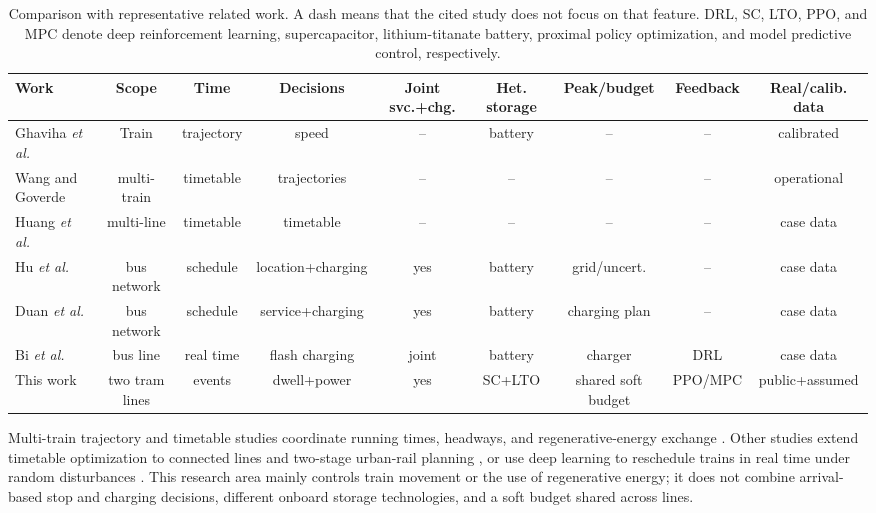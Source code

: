 \documentclass[conference]{IEEEtran}
\begin{document}
\begin{table}[t]
\centering
\caption{Comparison with representative related work. A dash means that the cited study does not focus on that feature. DRL, SC, LTO, PPO, and MPC denote deep reinforcement learning, supercapacitor, lithium-titanate battery, proximal policy optimization, and model predictive control, respectively.}
\label{tab:positioning}
\scriptsize
\setlength{\tabcolsep}{2.5pt}
\begin{tabular}{p{2.5cm}cccccccc}
\toprule
Work & Scope & Time & Decisions & Joint svc.+chg. & Het. storage & Peak/budget & Feedback & Real/calib. data \\
\midrule
Ghaviha \textit{et al.} \cite{ghaviha2019speed} & Train & trajectory & speed & -- & battery & -- & -- & calibrated \\
Wang and Goverde \cite{wang2019multitrain} & multi-train & timetable & trajectories & -- & -- & -- & -- & operational \\
Huang \textit{et al.} \cite{huang2021integrated} & multi-line & timetable & timetable & -- & -- & -- & -- & case data \\
Hu \textit{et al.} \cite{hu2022joint} & bus network & schedule & location+charging & yes & battery & grid/uncert. & -- & case data \\
Duan \textit{et al.} \cite{duan2023integrated} & bus network & schedule & service+charging & yes & battery & charging plan & -- & case data \\
Bi \textit{et al.} \cite{bi2024realtime} & bus line & real time & flash charging & joint & battery & charger & DRL & case data \\
This work & two tram lines & events & dwell+power & yes & SC+LTO & shared soft budget & PPO/MPC & public+assumed \\
\bottomrule
\end{tabular}
\end{table}

Multi-train trajectory and timetable studies coordinate running times, headways, and regenerative-energy exchange \cite{wang2019multitrain,liu2020robust,yang2020biobjective}. Other studies extend timetable optimization to connected lines and two-stage urban-rail planning \cite{huang2021integrated,huang2023twostage}, or use deep learning to reschedule trains in real time under random disturbances \cite{liao2020realtime}. This research area mainly controls train movement or the use of regenerative energy; it does not combine arrival-based stop and charging decisions, different onboard storage technologies, and a soft budget shared across lines.
\end{document}
